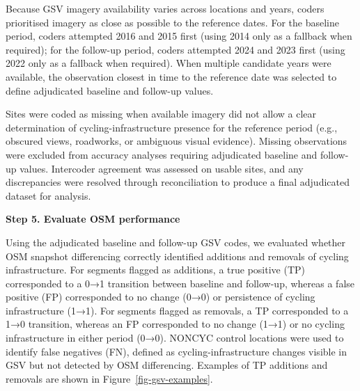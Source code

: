 \documentclass[
]{article}
\begin{document}
Because GSV imagery availability varies across locations and years,
coders prioritised imagery as close as possible to the reference dates.
For the baseline period, coders attempted 2016 and 2015 first (using
2014 only as a fallback when required); for the follow-up period, coders
attempted 2024 and 2023 first (using 2022 only as a fallback when
required). When multiple candidate years were available, the observation
closest in time to the reference date was selected to define adjudicated
baseline and follow-up values.

Sites were coded as missing when available imagery did not allow a clear
determination of cycling-infrastructure presence for the reference
period (e.g., obscured views, roadworks, or ambiguous visual evidence).
Missing observations were excluded from accuracy analyses requiring
adjudicated baseline and follow-up values. Intercoder agreement was
assessed on usable sites, and any discrepancies were resolved through
reconciliation to produce a final adjudicated dataset for analysis.

\textbf{Step 5. Evaluate OSM performance}

Using the adjudicated baseline and follow-up GSV codes, we evaluated
whether OSM snapshot differencing correctly identified additions and
removals of cycling infrastructure. For segments flagged as additions, a
true positive (TP) corresponded to a 0→1 transition between baseline and
follow-up, whereas a false positive (FP) corresponded to no change (0→0)
or persistence of cycling infrastructure (1→1). For segments flagged as
removals, a TP corresponded to a 1→0 transition, whereas an FP
corresponded to no change (1→1) or no cycling infrastructure in either
period (0→0). NONCYC control locations were used to identify false
negatives (FN), defined as cycling-infrastructure changes visible in GSV
but not detected by OSM differencing. Examples of TP additions and
removals are shown in Figure~\ref{fig-gsv-examples}.
\end{document}
